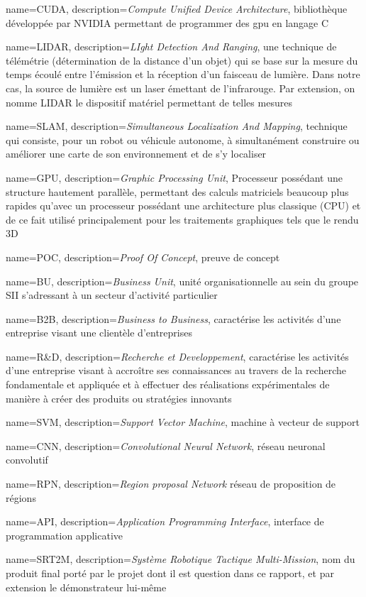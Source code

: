 {
	name={CUDA},
	description={\emph{Compute Unified Device Architecture}, bibliothèque développée par NVIDIA permettant de programmer des \gls{gpu} en langage C}
}


{
	name={LIDAR},
	description={\emph{LIght Detection And Ranging}, une technique de télémétrie (détermination de la distance d'un objet) qui se base sur la mesure du temps écoulé entre l'émission et la réception d'un faisceau de lumière. Dans notre cas, la source de lumière est un laser émettant de l'infrarouge. Par extension, on nomme LIDAR le dispositif matériel permettant de telles mesures}
}

{
	name={SLAM},
	description={\emph{Simultaneous Localization And Mapping}, technique qui consiste, pour un robot ou véhicule autonome, à simultanément construire ou améliorer une carte de son environnement et de s’y localiser}
}

{
	name={GPU},
	description={\emph{Graphic Processing Unit}, Processeur possédant une structure hautement parallèle, permettant des calculs matriciels beaucoup plus rapides qu'avec un processeur possédant une architecture plus classique (CPU) et de ce fait utilisé principalement pour les traitements graphiques tels que le rendu 3D}
}

{
	name={POC},
	description={\emph{Proof Of Concept}, preuve de concept}
}

{
	name={BU},
	description={\emph{Business Unit}, unité organisationnelle au sein du groupe SII s'adressant à un secteur d'activité particulier}
}

{
	name={B2B},
	description={\emph{Business to Business}, caractérise les activités d'une entreprise visant une clientèle d'entreprises}
}

{
	name={R\&D},
	description={\emph{Recherche et Developpement}, caractérise les activités d'une entreprise visant à accroître ses connaissances au travers de la recherche fondamentale et appliquée et à effectuer des réalisations expérimentales de manière à créer des produits ou stratégies innovants}
}

{
	name={SVM},
	description={\emph{Support Vector Machine}, machine à vecteur de support}
}

{
	name={CNN},
	description={\emph{Convolutional Neural Network}, réseau neuronal convolutif}
}

{
	name={RPN},
	description={\emph{Region proposal Network} réseau de proposition de régions}
}

{
	name={API},
	description={\emph{Application Programming Interface}, interface de programmation applicative}
}

{
	name={SRT2M},
	description={\emph{Système Robotique Tactique Multi-Mission}, nom du produit final porté par le projet dont il est question dans ce rapport, et par extension le démonstrateur lui-même}
}
